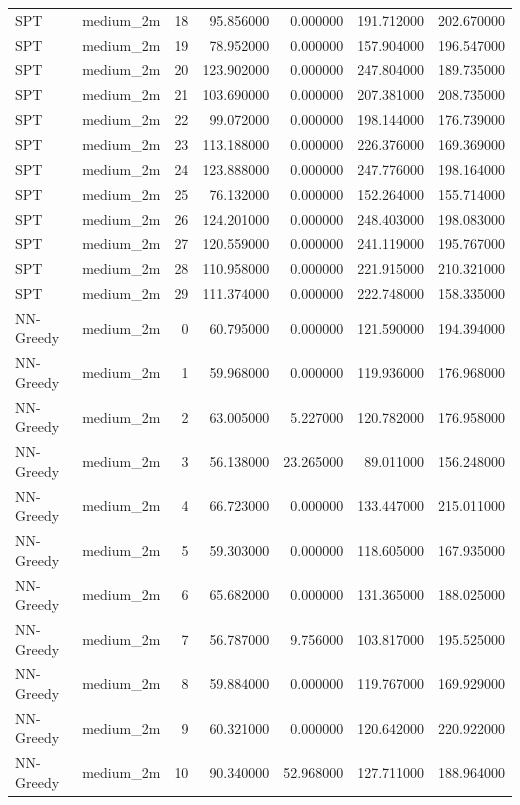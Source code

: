 \begin{tabular}{llrrrrr}
SPT & medium_2m & 18 & 95.856000 & 0.000000 & 191.712000 & 202.670000 \\
SPT & medium_2m & 19 & 78.952000 & 0.000000 & 157.904000 & 196.547000 \\
SPT & medium_2m & 20 & 123.902000 & 0.000000 & 247.804000 & 189.735000 \\
SPT & medium_2m & 21 & 103.690000 & 0.000000 & 207.381000 & 208.735000 \\
SPT & medium_2m & 22 & 99.072000 & 0.000000 & 198.144000 & 176.739000 \\
SPT & medium_2m & 23 & 113.188000 & 0.000000 & 226.376000 & 169.369000 \\
SPT & medium_2m & 24 & 123.888000 & 0.000000 & 247.776000 & 198.164000 \\
SPT & medium_2m & 25 & 76.132000 & 0.000000 & 152.264000 & 155.714000 \\
SPT & medium_2m & 26 & 124.201000 & 0.000000 & 248.403000 & 198.083000 \\
SPT & medium_2m & 27 & 120.559000 & 0.000000 & 241.119000 & 195.767000 \\
SPT & medium_2m & 28 & 110.958000 & 0.000000 & 221.915000 & 210.321000 \\
SPT & medium_2m & 29 & 111.374000 & 0.000000 & 222.748000 & 158.335000 \\
NN-Greedy & medium_2m & 0 & 60.795000 & 0.000000 & 121.590000 & 194.394000 \\
NN-Greedy & medium_2m & 1 & 59.968000 & 0.000000 & 119.936000 & 176.968000 \\
NN-Greedy & medium_2m & 2 & 63.005000 & 5.227000 & 120.782000 & 176.958000 \\
NN-Greedy & medium_2m & 3 & 56.138000 & 23.265000 & 89.011000 & 156.248000 \\
NN-Greedy & medium_2m & 4 & 66.723000 & 0.000000 & 133.447000 & 215.011000 \\
NN-Greedy & medium_2m & 5 & 59.303000 & 0.000000 & 118.605000 & 167.935000 \\
NN-Greedy & medium_2m & 6 & 65.682000 & 0.000000 & 131.365000 & 188.025000 \\
NN-Greedy & medium_2m & 7 & 56.787000 & 9.756000 & 103.817000 & 195.525000 \\
NN-Greedy & medium_2m & 8 & 59.884000 & 0.000000 & 119.767000 & 169.929000 \\
NN-Greedy & medium_2m & 9 & 60.321000 & 0.000000 & 120.642000 & 220.922000 \\
NN-Greedy & medium_2m & 10 & 90.340000 & 52.968000 & 127.711000 & 188.964000 \\

\end{tabular}
